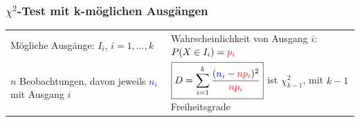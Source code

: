	\subsubsection{$\chi^2$-Test mit k-möglichen Ausgängen}
		
		\begin{tabular}{l l}
			Mögliche Ausgänge: $I_i$, $i=1,\ldots,k$&
			Wahrscheinlichkeit von Ausgang $i$: $P(X\in I_i)=\textcolor{red}{p_i}$\\
			$n$ Beobachtungen, davon jeweils \textcolor{blue}{$n_i$} mit Ausgang $i$ &
			$\boxed{D=\sum\limits_{i=1}^{k}\frac{(\textcolor{blue}{n_i}-\textcolor{red}{np_i})^2}{\textcolor{red}{np_i}}}$ \hspace{4mm} ist $\chi^2_{k-1}$, mit $k-1$ Freiheitsgrade\\
		\end{tabular}
        

